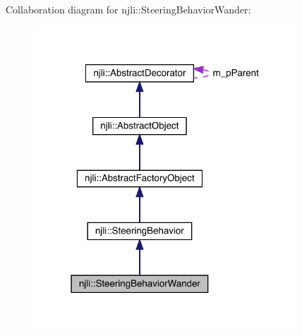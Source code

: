 Collaboration diagram for njli\+:\+:Steering\+Behavior\+Wander\+:\nopagebreak
\begin{figure}[H]
\begin{center}
\leavevmode
\includegraphics[width=279pt]{classnjli_1_1_steering_behavior_wander__coll__graph}
\end{center}
\end{figure}
